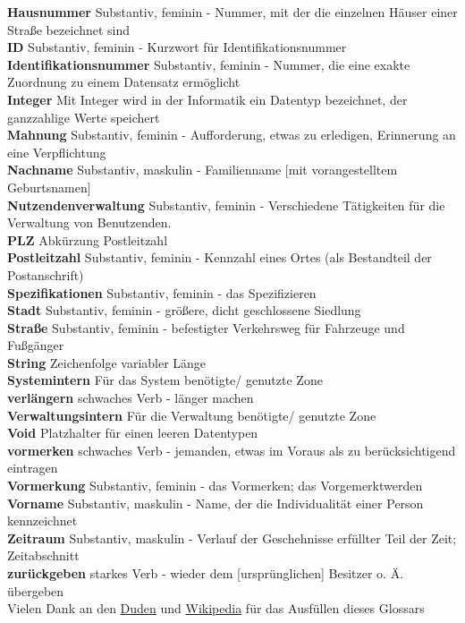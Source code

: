 \documentclass{article}
\begin{document}
    \textbf{Hausnummer} Substantiv, feminin - Nummer, mit der die einzelnen Häuser einer Straße bezeichnet sind\\
    \textbf{ID} Substantiv, feminin - Kurzwort für Identifikationsnummer\\
    \textbf{Identifikationsnummer} Substantiv, feminin - Nummer, die eine exakte Zuordnung zu einem Datensatz ermöglicht\\
    \textbf{Integer} Mit Integer wird in der Informatik ein Datentyp bezeichnet, der ganzzahlige Werte speichert\\
    \textbf{Mahnung} Substantiv, feminin - Aufforderung, etwas zu erledigen, Erinnerung an eine Verpflichtung\\
    \textbf{Nachname} Substantiv, maskulin - Familienname [mit vorangestelltem Geburtsnamen]\\
    \textbf{Nutzendenverwaltung} Substantiv, feminin -  Verschiedene Tätigkeiten für die Verwaltung von Benutzenden.\\
    \textbf{PLZ} Abkürzung Post­leit­zahl\\
    \textbf{Post­leit­zahl} Substantiv, feminin - Kennzahl eines Ortes (als Bestandteil der Postanschrift)\\
    \textbf{Spezifikationen} Substantiv, feminin - das Spezifizieren\\
    \textbf{Stadt} Substantiv, feminin - größere, dicht geschlossene Siedlung\\
    \textbf{Straße} Substantiv, feminin - befestigter Verkehrsweg für Fahrzeuge und Fußgänger\\
    \textbf{String} Zeichenfolge variabler Länge\\
    \textbf{Systemintern} Für das System benötigte/ genutzte Zone\\
    \textbf{verlängern} schwaches Verb - länger machen\\
    \textbf{Verwaltungsintern} Für die Verwaltung benötigte/ genutzte Zone\\
    \textbf{Void} Platzhalter für einen leeren Datentypen\\
    \textbf{vormerken} schwaches Verb - jemanden, etwas im Voraus als zu berücksichtigend eintragen\\
    \textbf{Vormerkung} Substantiv, feminin - das Vormerken; das Vorgemerktwerden\\
    \textbf{Vorname} Substantiv, maskulin - Name, der die Individualität einer Person kennzeichnet\\
    \textbf{Zeitraum} Substantiv, maskulin - Verlauf der Geschehnisse erfüllter Teil der Zeit; Zeitabschnitt\\
    \textbf{zurückgeben} starkes Verb - wieder dem [ursprünglichen] Besitzer o. Ä. übergeben\\

    Vielen Dank an den \href{https://www.duden.de/}{Duden} und \href{https://de.wikipedia.org/}{Wikipedia} für das Ausfüllen dieses Glossars
\end{document}
